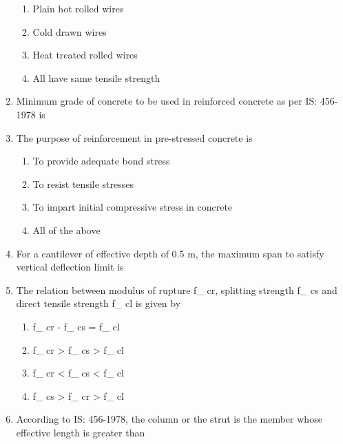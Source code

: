 \documentclass[11pt,a4paper]{article}
\begin{document}
\begin{enumerate}
\begin{enumerate}[label=\Alph*.]
\item{Plain hot rolled wires}
\item{Cold drawn wires}
\item{Heat treated rolled wires}
\item{All have same tensile strength}
\end{enumerate}
\item{Minimum grade of concrete to be used in reinforced concrete as per IS: 456-1978 is}
\\
\item{The purpose of reinforcement in pre-stressed concrete is}
\begin{enumerate}[label=\Alph*.]
\item{To provide adequate bond stress}
\item{To resist tensile stresses}
\item{To impart initial compressive stress in concrete}
\item{All of the above}
\end{enumerate}
\item{For a cantilever of effective depth of 0.5 m, the maximum span to satisfy vertical deflection limit is}
\\
\item{The relation between modulus of rupture f\_ cr, splitting strength f\_ cs and direct tensile strength f\_ cl is given by}
\begin{enumerate}[label=\Alph*.]
\item{f\_ cr - f\_ cs = f\_ cl}
\item{f\_ cr > f\_ cs > f\_ cl}
\item{f\_ cr < f\_ cs < f\_ cl}
\item{f\_ cs > f\_ cr > f\_ cl}
\end{enumerate}
\item{According to IS: 456-1978, the column or the strut is the member whose effective length is greater than}

\end{enumerate}
\end{document}
